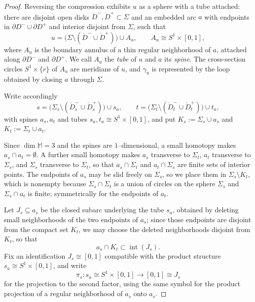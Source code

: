 \documentclass[10pt,a4paper]{amsart}
\newcommand{\MM}{\mathbb{M}}
\begin{document}
\begin{proof}
    Reversing the compression exhibits $u$ as a sphere with a tube attached: there are disjoint open disks $\mathring{D}^{-}, \mathring{D}^{+} \subset \Sigma$ and an embedded arc $a$ with endpoints in $\partial D^{-} \cup \partial D^{+}$ and interior disjoint from $\Sigma$, such that
    \[
        u = \bigl(\Sigma \setminus (\mathring{D}^{-} \cup \mathring{D}^{+})\bigr) \cup A_u ,
        \qquad A_u \cong S^1 \times [0,1] ,
    \]
    where $A_u$ is the boundary annulus of a thin regular neighborhood of $a$, attached along $\partial D^{-}$ and $\partial D^{+}$.
    We call $A_u$ the \emph{tube} of $u$ and $a$ its \emph{spine}.
    The cross-section circles $S^1 \times \{r\}$ of $A_u$ are meridians of $u$, and $\gamma_u$ is represented by the loop obtained by closing $a$ through $\Sigma$.

    Write accordingly
    \[
        s = \bigl(\Sigma_s \setminus (\mathring{D}_s^{-} \cup \mathring{D}_s^{+})\bigr) \cup s_a ,
        \qquad
        t = \bigl(\Sigma_t \setminus (\mathring{D}_t^{-} \cup \mathring{D}_t^{+})\bigr) \cup t_a ,
    \]
    with spines $a_s, a_t$ and tubes $s_a, t_a \cong S^1 \times [0,1]$, and put $K_s := \Sigma_s \cup a_s$ and $K_t := \Sigma_t \cup a_t$.

    Since $\dim \MM = 3$ and the spines are $1$--dimensional, a small homotopy makes $a_s \cap a_t = \emptyset$.
    A further small homotopy makes $a_s$ transverse to $\Sigma_t$, $a_t$ transverse to $\Sigma_s$, and $\Sigma_s$ transverse to $\Sigma_t$, so that $a_s \cap \Sigma_t$ and $a_t \cap \Sigma_s$ are finite sets of interior points.
    The endpoints of $a_s$ may be slid freely on $\Sigma_s$, so we place them in $\Sigma_s \setminus K_t$, which is nonempty because $\Sigma_s \cap \Sigma_t$ is a union of circles on the sphere $\Sigma_s$ and $\Sigma_s \cap a_t$ is finite; symmetrically for the endpoints of $a_t$.

    Let $J_s \subseteq a_s$ be the closed subarc underlying the tube $s_a$, obtained by deleting small neighborhoods of the two endpoints of $a_s$; since those endpoints are disjoint from the compact set $K_t$, we may choose the deleted neighborhoods disjoint from $K_t$, so that
    \[
        a_s \cap K_t \subset \operatorname{int}(J_s) .
    \]
    Fix an identification $J_s \cong [0,1]$ compatible with the product structure $s_a \cong S^1 \times [0,1]$, and write
    \[
        \pi_s \colon s_a \cong S^1 \times [0,1] \longrightarrow [0,1] \cong J_s
    \]
    for the projection to the second factor, using the same symbol for the product projection of a regular neighborhood of $a_s$ onto $a_s$.


\end{proof}
\end{document}
